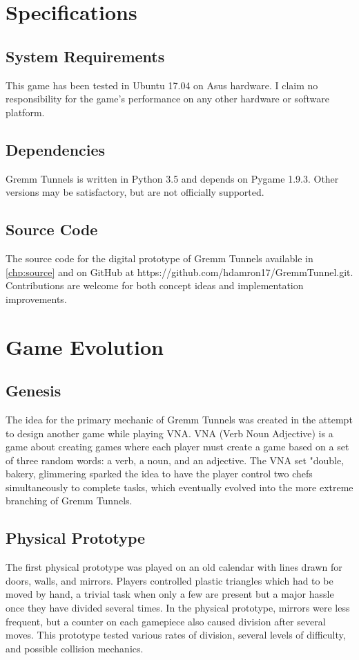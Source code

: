 \documentclass{scrreprt}
\begin{document}
	\chapter{Specifications}
		\section{System Requirements}
			This game has been tested in Ubuntu 17.04 on Asus hardware. I claim no responsibility for the game's performance on any other hardware or software platform.
		
		\section{Dependencies}
			Gremm Tunnels is written in Python 3.5 and depends on Pygame 1.9.3. Other versions may be satisfactory, but are not officially supported.
			
		\section{Source Code}
			The source code for the digital prototype of Gremm Tunnels available in \autoref{chp:source} and on GitHub at https://github.com/hdamron17/GremmTunnel.git. Contributions are welcome for both concept ideas and implementation improvements.
	
	\chapter{Game Evolution}
			
		\section{Genesis}
			The idea for the primary mechanic of Gremm Tunnels was created in the attempt to design another game while playing VNA. VNA (Verb Noun Adjective) is a game about creating games where each player must create a game based on a set of three random words: a verb, a noun, and an adjective. The VNA set "double, bakery, glimmering sparked the idea to have the player control two chefs simultaneously to complete tasks, which eventually evolved into the more extreme branching of Gremm Tunnels.
			
		\section{Physical Prototype}
			The first physical prototype was played on an old calendar with lines drawn for doors, walls, and mirrors. Players controlled plastic triangles which had to be moved by hand, a trivial task when only a few are present but a major hassle once they have divided several times. In the physical prototype, mirrors were less frequent, but a counter on each gamepiece also caused division after several moves. This prototype tested various rates of division, several levels of difficulty, and possible collision mechanics.
			
\end{document}
